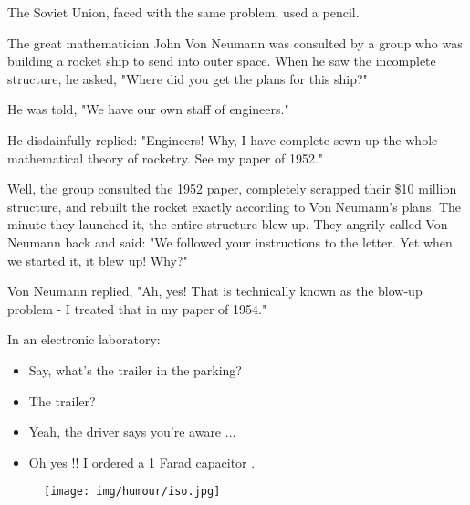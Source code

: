 	The Soviet Union, faced with the same problem, used a pencil.
	\begin{center}\underline{\hspace{5 cm}}\end{center}
	
	The great mathematician John Von Neumann was consulted by a group who was building a rocket ship to send into outer space. When he saw the incomplete structure, he asked, "Where did you get the plans for this ship?"
	
	He was told, "We have our own staff of engineers."
	
	He disdainfully replied: "Engineers! Why, I have complete sewn up the whole mathematical theory of rocketry. See my paper of 1952."
	
	Well, the group consulted the 1952 paper, completely scrapped their \$10 million structure, and rebuilt the rocket exactly according to Von Neumann's plans. The minute they launched it, the entire structure blew up. They angrily called Von Neumann back and said: "We followed your instructions to the letter. Yet when we started it, it blew up! Why?"
	
	Von Neumann replied, "Ah, yes! That is technically known as the blow-up problem - I treated that in my paper of 1954."

	\begin{center}\underline{\hspace{5 cm}}\end{center}
	
	In an electronic laboratory:
	
	\begin{itemize}
		\item Say, what's the trailer in the parking?
	
		\item The trailer?
	
		\item Yeah, the driver says you're aware ...
	
		\item Oh yes !! I ordered a 1 Farad capacitor .
	\end{itemize}

	\begin{center}\underline{\hspace{5 cm}}\end{center}
	
	\begin{figure}[H]
		\begin{center}
		\texttt{[image: img/humour/iso.jpg]}
		\end{center}	
	\end{figure}
	
